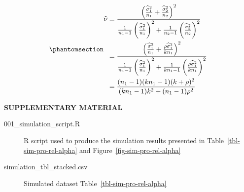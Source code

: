 \documentclass[
  12pt]{article}
\begin{document}
\begin{equation}\phantomsection\label{eq-df-ws}{\begin{split}
  \widehat{\nu} & = \frac{\left( \frac{\widehat{\sigma}^2_1}{n_1} + \frac{\widehat{\sigma}^2_2}{n_2} \right)^2}{\frac{1}{n_1-1} \left( \frac{\widehat{\sigma}^2_1}{n_1} \right)^2 + \frac{1}{n_2-1} \left( \frac{\widehat{\sigma}^2_2}{n_2} \right)^2} \\
  & = \frac{\left( \frac{\widehat{\sigma}^2_1}{n_1} + \frac{\rho\widehat{\sigma}^2_1}{kn_1} \right)^2}{\frac{1}{n_1-1} \left( \frac{\widehat{\sigma}^2_1}{n_1} \right)^2 + \frac{1}{kn_1-1} \left( \frac{\rho\widehat{\sigma}^2_1}{kn_1} \right)^2} \\
  & = \frac{(n_1-1)(kn_1-1)(k+\rho)^2}{(kn_1-1)k^2 + (n_1-1)\rho^2}
  \end{split}}\end{equation}

\label{supplementary-material}
\bigskip

\begin{center}

{\large\bf SUPPLEMENTARY MATERIAL}

\end{center}

\begin{description}
\item[001\_simulation\_script.R]
R script used to produce the simulation results presented in
Table~\ref{tbl-sim-pro-rel-alpha} and Figure~\ref{fig-sim-pro-rel-alpha}
\item[simulation\_tbl\_stacked.csv]
Simulated dataset Table~\ref{tbl-sim-pro-rel-alpha}
\end{description}


\renewcommand\refname{References}
  
\end{document}
